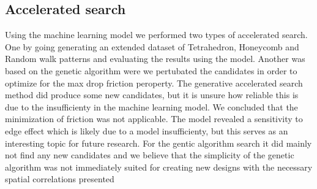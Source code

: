 


\subsection{Accelerated search}
Using the machine learning model we performed two types of accelerated search. One by going generating an extended dataset of Tetrahedron, Honeycomb and Random walk patterns and evaluating the results using the model. Another was based on the genetic algorithm were we pertubated the candidates in order to optimize for the max drop friction peroperty. The generative accelerated search method did produce some new candidates, but it is unsure how reliable this is due to the insufficienty in the machine learning model. We concluded that the minimization of friction was not applicable. The model revealed a sensitivity to edge effect which is likely due to a model insufficienty, but this serves as an interesting topic for future research. For the gentic algorithm search it did mainly not find any new candidates and we believe that the simplicity of the genetic algorithm was not immediately suited for creating new designs with the necessary spatial correlations presented 



